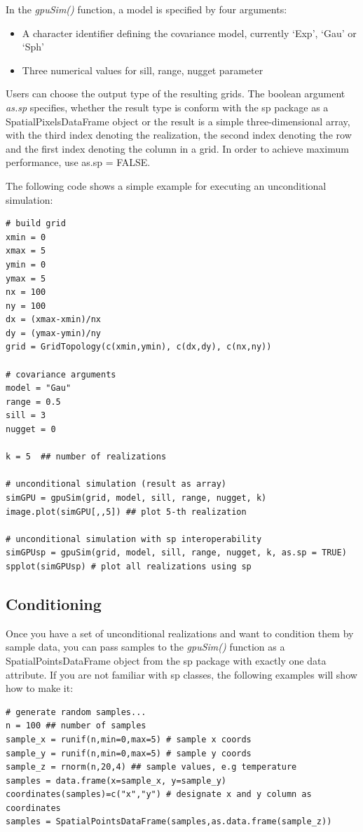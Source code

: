 \documentclass[12pt,oneside,a4paper]{article}
\begin{document}
 
 
In the \emph{gpuSim()} function, a model is specified by four arguments:
\begin{itemize}
	\item A character identifier defining the covariance model, currently `Exp', `Gau' or `Sph'
	\item Three numerical values for sill, range, nugget parameter
\end{itemize}

Users can choose the output type of the resulting grids. The boolean argument \emph{as.sp} specifies, whether the result type is conform with the sp package as a SpatialPixelsDataFrame object or the result is a simple three-dimensional array, with the third index denoting the realization, the second index denoting the row and the first index denoting the column in a grid.
In order to achieve maximum performance, use as.sp = FALSE.

The following code shows a simple example for executing an unconditional simulation:
\begin{verbatim}
# build grid
xmin = 0
xmax = 5
ymin = 0
ymax = 5
nx = 100
ny = 100
dx = (xmax-xmin)/nx
dy = (ymax-ymin)/ny
grid = GridTopology(c(xmin,ymin), c(dx,dy), c(nx,ny))

# covariance arguments
model = "Gau"
range = 0.5
sill = 3
nugget = 0

k = 5  ## number of realizations

# unconditional simulation (result as array)
simGPU = gpuSim(grid, model, sill, range, nugget, k)
image.plot(simGPU[,,5]) ## plot 5-th realization

# unconditional simulation with sp interoperability
simGPUsp = gpuSim(grid, model, sill, range, nugget, k, as.sp = TRUE)
spplot(simGPUsp) # plot all realizations using sp
\end{verbatim}



\subsection{Conditioning}
Once you have a set of unconditional realizations and want to condition them by sample data, you can pass samples to the \emph{gpuSim()} function as a SpatialPointsDataFrame object from the sp package with exactly one data attribute. If you are not familiar with sp classes, the following examples will show how to make it:

\begin{verbatim}
# generate random samples...
n = 100 ## number of samples
sample_x = runif(n,min=0,max=5) # sample x coords
sample_y = runif(n,min=0,max=5) # sample y coords
sample_z = rnorm(n,20,4) ## sample values, e.g temperature
samples = data.frame(x=sample_x, y=sample_y)
coordinates(samples)=c("x","y") # designate x and y column as coordinates
samples = SpatialPointsDataFrame(samples,as.data.frame(sample_z))
\end{verbatim}
\end{document}
